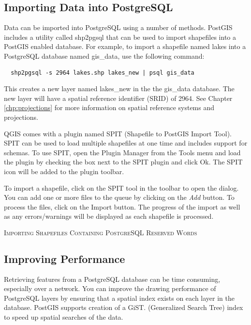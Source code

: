 \subsection{Importing Data into PostgreSQL}\label{sec:loading_postgis_data}
Data can be imported into PostgreSQL using a number of methods. PostGIS
includes a utility called shp2pgsql that can be used to import shapefiles into
a PostGIS enabled database. For example, to import a shapefile named lakes into a PostgreSQL database named gis\_data, use the following command:
\begin{verbatim} 
  shp2pgsql -s 2964 lakes.shp lakes_new | psql gis_data
\end{verbatim}
This creates a new layer named lakes\_new in the the gis\_data database. The
new layer will have a spatial reference identifier (SRID) of 2964. See Chapter
\ref{chp:projections} for more information on spatial reference systems and
projections.

QGIS comes with a
plugin named SPIT (Shapefile to PostGIS Import Tool).
SPIT can be used to load multiple shapefiles at one time and includes support
for schemas. To use SPIT, open the Plugin Manager from the Tools menu and load
the plugin by checking the box next to the SPIT plugin and click Ok. The SPIT
icon will be added to the plugin toolbar. 

To import a shapefile, click on the SPIT tool in the toolbar to open the dialog.
You can add one or more files to the queue by clicking on the \textsl{Add}
button. To process the files, click on the Import button. The progress of the
import as well as any errors/warnings will be displayed as each shapefile is
processed.  
\begin{Tip}\caption{\textsc{Importing Shapefiles Containing
PostgreSQL Reserved Words}}
\end{Tip} 
\subsection{Improving Performance}
Retrieving features from a PostgreSQL database can be time consuming,
especially over a network. You can improve the drawing performance of
PostgreSQL layers by ensuring that a  spatial index
exists on each layer in the database. PostGIS supports creation of a
 GiST.
(Generalized Search Tree) index to speed up spatial searches of the data.

